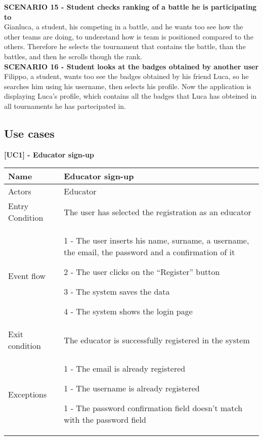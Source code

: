     \textbf{SCENARIO 15 - Student checks ranking of a battle he is participating to}\\
    Gianluca, a student, his competing in a battle, and he wants too see how the other teams are doing, to understand how is team is positioned compared to the others. Therefore he selects the tournament that contains the battle, than the battles, and then he scrolls though the rank.\\

    \textbf{SCENARIO 16 - Student looks at the badges obtained by another user}\\
    Filippo, a student, wants too see the badges obtained by his friend Luca, so he searches him using his username, then selects his profile. Now the application is displaying Luca's profile, which contains all the badges that Luca has obteined in all tournaments he has partecipated in.
    
    
    \subsection{Use cases}
    \begin{table}[h]
    \textbf{[UC1] - Educator sign-up}
    
      \centering
      \begin{tabular}{|p{3cm}|p{14cm}|}
        \hline
         Name & Educator sign-up \\
        \hline
        Actors & Educator \\
        \hline
        Entry Condition & The user has selected the registration as an educator \\
        \hline
        Event flow &  1 - The user inserts his name, surname, a username, the email,
        the password and a confirmation of it 
        
        2 - The user clicks on the ``Register'' button

        3 - The system saves the data

        4 - The system shows the login page
        \\
        \hline
        Exit condition & The educator is successfully registered in the system \\
        \hline
        Exceptions & 1 - The email is already registered
        
        1 - The username is already registered 
        
        1 - The password confirmation field doesn't match with the password field\\
        \hline
      \end{tabular}
      
    \end{table}

